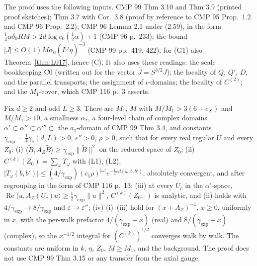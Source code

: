 The proof uses the following inputs. CMP 99 Thm 3.10 and Thm 3.9 (printed proof sketches); Thm 3.7 with Cor.~3.8 (proof by reference to CMP 95 Prop.~1.2 and CMP 96 Prop.~2.2); CMP 96 Lemma 2.1 under (2.59), in the form $\tfrac14\alpha\delta_0RM>2d\log c_0(\tfrac12\alpha)+1$ (CMP 96 p.~233); the bound $|J|\le O(1)M\alpha_0(L^j\eta)^{-3}$ (CMP 99 pp.~419, 422); for (G1) also Theorem~\ref{thm:L017}, hence (C). It also uses these readings: the scale bookkeeping C0 (written out for the vector $\hat J=S^{3/2}J$); the locality of $Q$, $Q'$, $D$, and the parallel transports; the assignment of $\iota$-domains; the locality of $C^{(2)}$; and the $M_1$-cover, which CMP 116 p.~3 asserts.

\begin{theorem}\label{thm:L019}
Fix $d\ge2$ and odd $L\ge3$. There are $M_1$, $M$ with $M/M_1>3(6+c_X)$ and $M/M_1>10$, a smallness $\alpha_*$, a four-level chain of complex domains $\alpha'\subset\alpha''\subset\alpha'''\subset$ the $a_1$-domain of CMP 99 Thm 3.4, and constants $\gamma_{\exp}=\tfrac14\gamma_e(d,L)>0$, $\varepsilon''>0$, $\rho>0$, such that for every real regular $U$ and every $Z_0$:
(i) $\langle\tilde B,A_Z\tilde B\rangle\ge\gamma_{\exp}\|\tilde B\|^2$ on the reduced space of $Z_0$;
(ii) $C^{(k)}(Z_0)=\sum_\omega T_\omega$ with (L1), (L2), $|T_\omega(b,b')|\le(4/\gamma_{\exp})(c_1\rho)^{|\omega|}e^{-\frac12\varepsilon d(\omega,b,b')}$, absolutely convergent, and after regrouping in the form of CMP 116 p.~13;
(iii) at every $U_c$ in the $\alpha'$-space, $\operatorname{Re}\langle u,A_Z(U_c)u\rangle\ge\tfrac12\gamma_{\exp}\|u\|^2$, $C^{(k)}(Z_0;\cdot)$ is analytic, and (ii) holds with $4/\gamma_{\exp}\to8/\gamma_{\exp}$ and $\varepsilon\to\varepsilon''$;
(iv) (i)--(iii) hold for $(x+A_Z)^{-1}$, $x\ge0$, uniformly in $x$, with the per-walk prefactor $4/(\gamma_{\exp}+x)$ (real) and $8/(\gamma_{\exp}+x)$ (complex), so the $x^{-1/2}$ integral for $(C^{(k)})^{1/2}$ converges walk by walk.
The constants are uniform in $k$, $\eta$, $Z_0$, $M\ge M_1$, and the background. The proof does not use CMP 99 Thm 3.15 or any transfer from the axial gauge.
\end{theorem}
